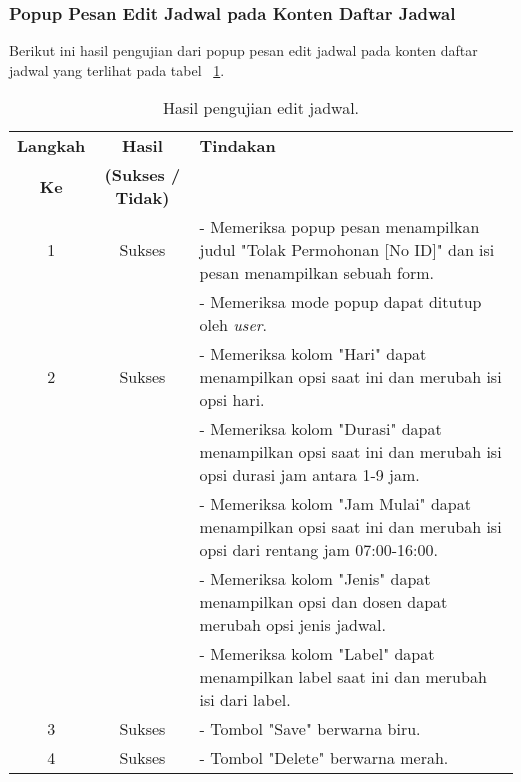 \subsubsection{Popup Pesan Edit Jadwal pada Konten Daftar Jadwal}
Berikut ini hasil pengujian dari popup pesan edit jadwal pada konten daftar jadwal yang terlihat pada tabel ~\ref{hasil:EditJadwal}.
\begin{table}[H]
	\centering 
	\caption{Hasil pengujian edit jadwal.}
	\label{hasil:EditJadwal}
	\begin{tabular}{|c| c| p{}|}
		\toprule
		\textbf{Langkah} & \textbf{Hasil} & \textbf{Tindakan}\\
		\textbf{Ke} & \textbf{(Sukses / Tidak)} &\\
		\midrule
		1&Sukses& - Memeriksa popup pesan menampilkan judul "Tolak Permohonan [No ID]" dan isi pesan menampilkan sebuah form.\\
		&& - Memeriksa mode popup dapat ditutup oleh \textit{user}.\\
		\hline
		2&Sukses& - Memeriksa kolom "Hari" dapat menampilkan opsi saat ini dan merubah isi opsi hari.\\
		&& - Memeriksa kolom "Durasi" dapat menampilkan opsi saat ini dan merubah isi  opsi durasi jam antara 1-9 jam.\\
		&& - Memeriksa kolom "Jam Mulai" dapat menampilkan opsi saat ini dan merubah isi opsi dari rentang jam 07:00-16:00.\\
		&& - Memeriksa kolom "Jenis" dapat menampilkan opsi dan dosen dapat merubah opsi jenis jadwal.\\
		&& - Memeriksa kolom "Label" dapat menampilkan label saat ini dan merubah isi dari label.\\
		\hline
		3&Sukses&- Tombol "Save" berwarna biru.\\
		\hline
		4&Sukses&- Tombol "Delete" berwarna merah.\\	
		\bottomrule		
	\end{tabular} 
\end{table}


